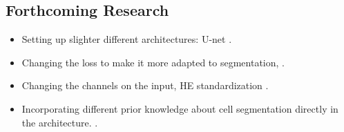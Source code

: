 \documentclass[a0,portrait]{a0poster}
\begin{document}
\begin{multicols}{2}



\section*{Forthcoming Research}

\color{SaddleBrown} %

\begin{itemize}
\item Setting up slighter different architectures: U-net \cite{UNet}.
\item Changing the loss to make it more adapted to segmentation, \cite{UNet}.
\item Changing the channels on the input, HE standardization \cite{deconvolution}.
\item Incorporating different prior knowledge about cell segmentation directly in the architecture. \cite{ranefall2016fast}.
\end{itemize}

\color{DarkSlateGray} %


%


\end{multicols}
\end{document}
